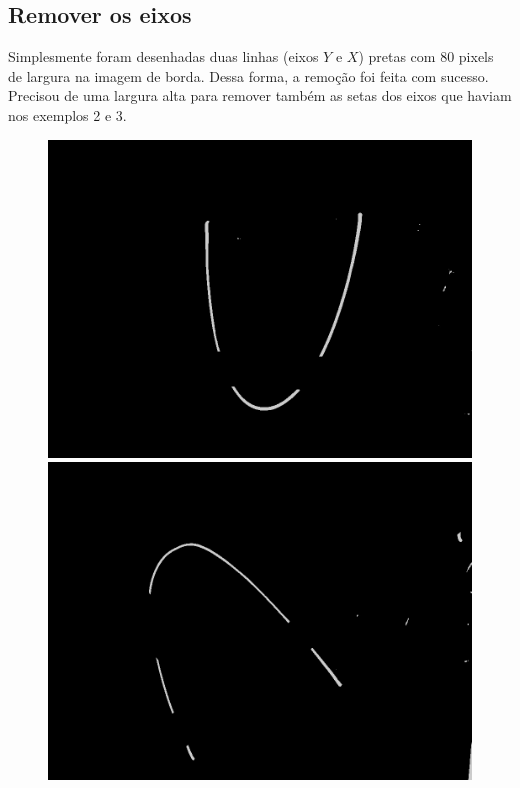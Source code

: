 \documentclass{article}
\begin{document}
   \subsection{Remover os eixos}
   Simplesmente foram desenhadas duas linhas (eixos \(Y\) e \(X\)) pretas com 80 pixels de largura na imagem de borda. Dessa forma, a remoção foi feita com sucesso. Precisou de uma largura alta para remover também as setas dos eixos que haviam nos exemplos 2 e 3.
   \begin{figure}[h!]
   \centering
    \subfigure
        {\includegraphics[scale=0.1]{exemplo1WithoutAxis.jpg}}
    \subfigure
        {\includegraphics[scale=0.1]{exemplo2WithoutAxis.jpg}}
    \subfigure

\end{figure}
\end{document}
